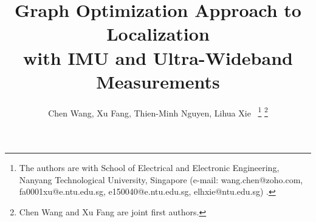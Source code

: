 \documentclass[journal]{IEEEtran}
\begin{document}
%
\title{Graph Optimization Approach to Localization \\ with IMU and Ultra-Wideband Measurements}
%
%
%

\author{Chen Wang,
        Xu Fang,
        Thien-Minh Nguyen, 
        Lihua
        Xie~%
\thanks{The authors are with School of Electrical and Electronic Engineering, Nanyang Technological University, Singapore (e-mail: wang.chen@zoho.com, fa0001xu@e.ntu.edu.sg, e150040@e.ntu.edu.sg, elhxie@ntu.edu.sg) .}%
\thanks{Chen Wang and Xu Fang are joint first authors.}%
}

% 
%
\end{document}
